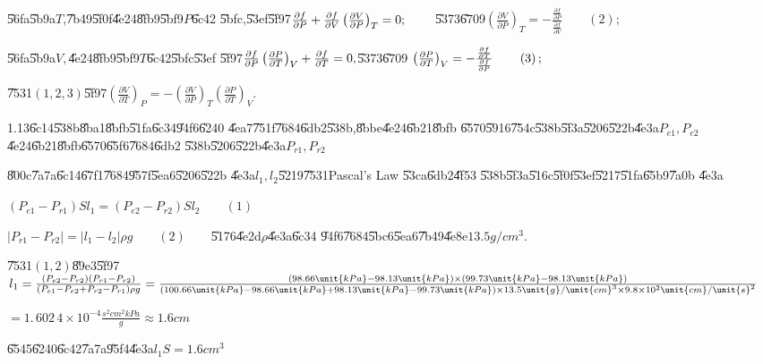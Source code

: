 \documentclass{article}
\begin{document}
\U{56fa}\U{5b9a}$T$,\U{7b49}\U{5f0f}\U{4e24}\U{8fb9}\U{5bf9}$P$\U{6c42}%
\U{5bfc},\U{53ef}\U{5f97}$\frac{\partial f}{\partial P}+\frac{\partial f}{%
\partial V}\left( \frac{\partial V}{\partial P}\right) _{T}=0;\qquad $%
\U{5373}\U{6709}\qquad $\left( \frac{\partial V}{\partial P}\right) _{T}=-%
\frac{\frac{\partial f}{\partial P}}{\frac{\partial f}{\partial V}}\qquad
\left( 2\right) ;$

\U{56fa}\U{5b9a}$V,$\U{4e24}\U{8fb9}\U{5bf9}$T$\U{6c42}\U{5bfc}\U{53ef}%
\U{5f97}\qquad $\frac{\partial f}{\partial P}\left( \frac{\partial P}{%
\partial T}\right) _{V}+\frac{\partial f}{\partial T}=0,$\U{5373}\U{6709}%
\qquad $\left( \frac{\partial P}{\partial T}\right) _{V}=-\frac{\frac{%
\partial f}{\partial T}}{\frac{\partial f}{\partial P}}\qquad \left(
3\right) ;$

\U{7531}$\left( 1,2,3\right) $\U{5f97}\qquad \qquad $\left( \frac{\partial V%
}{\partial T}\right) _{P}=-\left( \frac{\partial V}{\partial P}\right)
_{T}\left( \frac{\partial P}{\partial T}\right) _{V}.$

1.13\qquad \U{6c14}\U{538b}\U{8ba1}\U{8bfb}\U{51fa}\U{6c34}\U{94f6}\U{6240}%
\U{4ea7}\U{751f}\U{7684}\U{6db2}\U{538b},\U{8bbe}\U{4e24}\U{6b21}\U{8bfb}%
\U{6570}\U{5916}\U{754c}\U{538b}\U{5f3a}\U{5206}\U{522b}\U{4e3a}$%
P_{e1},P_{e2}\qquad $\U{4e24}\U{6b21}\U{8bfb}\U{6570}\U{65f6}\U{7684}\U{6db2}%
\U{538b}\U{5206}\U{522b}\U{4e3a}\qquad $P_{r1},P_{r2}$

\U{800c}\U{7a7a}\U{6c14}\U{67f1}\U{7684}\U{957f}\U{5ea6}\U{5206}\U{522b}%
\U{4e3a}$l_{1},l_{2}$\U{5219}\U{7531}Pascal's Law \U{53ca}\U{6db2}\U{4f53}%
\U{538b}\U{5f3a}\U{516c}\U{5f0f}\U{53ef}\U{5217}\U{51fa}\U{65b9}\U{7a0b}%
\U{4e3a}

$\left( P_{e1}-P_{r1}\right) Sl_{1}=\left( P_{e2}-P_{r2}\right) Sl_{2}\qquad
\left( 1\right) $

$\left\vert P_{r1}-P_{r2}\right\vert =\left\vert l_{1}-l_{2}\right\vert \rho
g\qquad \left( 2\right) \qquad $\U{5176}\U{4e2d}$\rho $\U{4e3a}\U{6c34}%
\U{94f6}\U{7684}\U{5bc6}\U{5ea6}\U{7b49}\U{4e8e}$13.5\unit{g}/\unit{cm}^{3}.$

\U{7531}$\left( 1,2\right) $\U{89e3}\U{5f97}\qquad $l_{1}=\frac{\left(
P_{e2}-P_{r2}\right) \left( P_{r1}-P_{r2}\right) }{\left(
P_{e1}-P_{e2}+P_{r2}-P_{r1}\right) \rho g}=\frac{\left( 98.66\unit{kPa}-98.13%
\unit{kPa}\right) \times \left( 99.73\unit{kPa}-98.13\unit{kPa}\right) }{%
\left( 100.66\unit{kPa}-98.66\unit{kPa}+98.13\unit{kPa}-99.73\unit{kPa}%
\right) \times 13.5\unit{g}/\unit{cm}^{3}\times 9.8\times 10^{2}\unit{cm}/%
\unit{s}^{2}}$

$=\allowbreak 1.\,\allowbreak 602\,4\times 10^{-4}\frac{\unit{s}^{2}\unit{cm}%
^{2}\unit{kPa}\allowbreak }{\unit{g}}\approx 1.6\unit{cm}$

\U{6545}\U{6240}\U{6c42}\U{7a7a}\U{95f4}\U{4e3a}\qquad $l_{1}S=1.6\unit{cm}%
^{3}$
\end{document}
